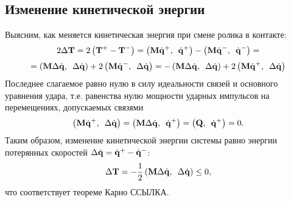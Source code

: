 
\subsection{Изменение кинетической энергии}
Выясним, как меняется кинетическая энергия при смене ролика в контакте:
$$
2\Delta\ke  =  2\left(\ke^+ - \ke^-\right) = \dotp{\mke\dqposle}{\dqposle} - \dotp{\mke\dqdo}{\dqdo} =
$$
$$
= \dotp{\mke\deltadq}{\deltadq} + 2\dotp{\mke\dqdo}{\deltadq} = -\dotp{\mke\deltadq}{\deltadq} + 2\dotp{\mke\dqposle}{\deltadq}
$$
Последнее слагаемое равно нулю в силу идеальности связей и основного уравнения удара, т.е. равенства нулю мощности ударных импульсов на перемещениях, допускаемых связями
$$\logicWorkZero.$$
Таким образом, изменение кинетической энергии системы равно энергии потерянных скоростей $\deltadq = \dqposle - \dqdo$:
\begin{equation*}
\eqDeltaT,
\end{equation*}
что соответствует теореме Карно ССЫЛКА.
